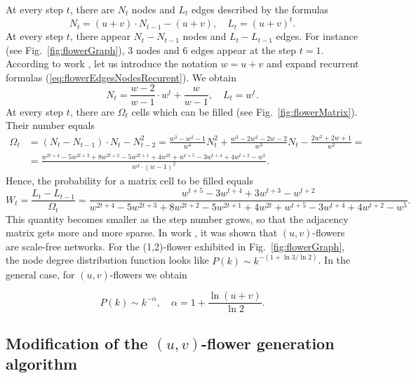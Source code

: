 \documentclass[aps,preprint]{revtex4}%
\begin{document}
At every step $t$, there are $N_{t}$ nodes and $L_{t}$ edges \cite{Rozenfeld1}
described by the formulas%
\begin{equation}
N_{t}=(u+v)\cdot N_{t-1}-(u+v),\quad L_{t}=(u+v)^{t}%
.\label{eq:flowerEdgesNodesRecurent}%
\end{equation}
At every step $t$, there appear $N_{t}-N_{t-1}$ nodes and $L_{t}-L_{t-1}$
edges. For instance (see Fig.~\ref{fig:flowerGraph}), 3 nodes and 6 edges
appear at the step $t=1$. According to work \cite{Rozenfeld1}, let us
introduce the notation $w=u+v$ and expand recurrent formulas
(\ref{eq:flowerEdgesNodesRecurent}). We obtain%
\begin{equation}
N_{t}=\frac{w-2}{w-1}\cdot w^{t}+\frac{w}{w-1},\quad L_{t}=w^{t}%
.\label{eq:flowerEdgesNodesOpenRecurent}%
\end{equation}
At every step $t$, there are $\Omega_{t}$ cells which can be filled (see
Fig.~\ref{fig:flowerMatrix}). Their number equals%
\begin{equation}%
\begin{split}
\Omega_{t} &  =(N_{t}-N_{t-1})\cdot N_{t}-N_{t-2}^{2}=\frac{w^{3}-w^{2}%
-1}{w^{4}}N_{t}^{2}+\frac{w^{3}-2w^{2}-2w-2}{w^{3}}N_{t}-\frac{2w^{2}%
+2w+1}{w^{2}}=\\
&  =\frac{w^{2t+4}-5w^{2t+3}+8w^{2t+2}-5w^{2t+1}+4w^{2t}+w^{t+5}%
-3w^{t+4}+4w^{t+2}-w^{5}}{w^{3}\cdot(w-1)^{2}}.
\end{split}
\label{eq:flowerEmpty}%
\end{equation}
Hence, the probability for a matrix cell to be filled equals%
\begin{equation}
W_{t}=\frac{L_{t}-L_{t-1}}{\Omega_{t}}=\frac{w^{t+5}-3w^{t+4}+3w^{t+3}%
-w^{t+2}}{w^{2t+4}-5w^{2t+3}+8w^{2t+2}-5w^{2t+1}+4w^{2t}+w^{t+5}%
-3w^{t+4}+4w^{t+2}-w^{5}}.
\end{equation}
This quantity becomes smaller as the step number grows, so that the adjacency
matrix gets more and more sparse. In work \cite{Dor1}, it was shown that
$(u,v)$-flowers are scale-free networks. For the (1,2)-flower exhibited in
Fig.~\ref{fig:flowerGraph}, the node degree distribution function looks like
$P(k)\sim k^{-(1+\ln{3}/\ln{2})}$. In the general case, for $(u,v)$-flowers we
obtain \cite{Rozenfeld1}%

\begin{equation}
P(k)\sim k^{-\alpha},\quad\alpha=1+\frac{\ln{(u+v)}}{\ln{2}}.
\end{equation}


\subsection{Modification of the $(u,v)$-flower generation algorithm}
\end{document}
